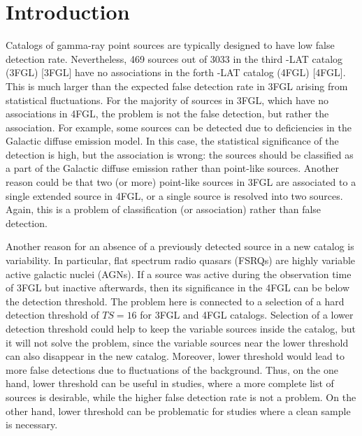 \section{Introduction}

Catalogs of gamma-ray point sources are typically designed to have low false detection rate. 
Nevertheless, 469 sources out of 3033 in the third \Fermi-LAT catalog (3FGL) [3FGL] have no associations 
in the forth \Fermi-LAT catalog (4FGL) [4FGL].
This is much larger than the expected false detection rate in 3FGL arising from statistical fluctuations.
For the majority of sources in 3FGL, which have no associations in 4FGL, the problem is not the false detection, 
but rather the association.
For example, some sources can be detected due to deficiencies in the Galactic diffuse emission model.
In this case, the statistical significance of the detection is high, but the association is wrong: the sources should be classified as
a part of the Galactic diffuse emission rather than point-like sources.
Another reason could be that two (or more) point-like sources in 3FGL are associated to a single extended source in 4FGL,
or a single source is resolved into two sources.
Again, this is a problem of classification (or association) rather than false detection.

Another reason for an absence of a previously detected source in a new catalog is variability.
In particular, flat spectrum radio quasars (FSRQs) are highly variable active galactic nuclei (AGNs).
If a source was active during the observation time of 3FGL but inactive afterwards, 
then its significance in the 4FGL can be below the detection threshold.
The problem here is connected to a selection of a hard detection threshold of $TS = 16$ for 3FGL and 4FGL catalogs.
Selection of a lower detection threshold could help to keep the variable sources inside the catalog, 
but it will not solve the problem, since the variable sources near the lower threshold can also disappear in the new catalog.
Moreover, lower threshold would lead to more false detections due to fluctuations of the background.
Thus, on the one hand, lower threshold can be useful in studies, where a more complete list of sources is desirable,
while the higher false detection rate is not a problem. On the other hand, lower threshold can be problematic for studies where 
a clean sample is necessary. 

